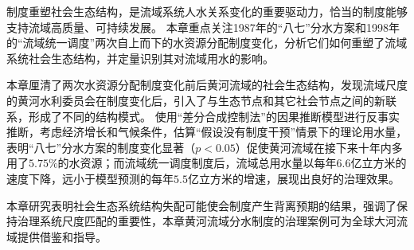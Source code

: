 制度重塑社会\textendash{}生态结构，是流域系统人\textendash{}水关系变化的重要驱动力，恰当的制度能够支持流域高质量、可持续发展。
本章重点关注1987年的``八七''分水方案和1998年的“流域统一调度”两次自上而下的水资源分配制度变化，分析它们如何重塑了流域系统社会\textendash{}生态结构，并定量识别其对流域用水的影响。

本章厘清了两次水资源分配制度变化前后黄河流域的社会\textendash{}生态结构，发现流域尺度的黄河水利委员会在制度变化后，引入了与生态节点和其它社会节点之间的新联系，形成了不同的结构模式。
使用“差分合成控制法”的因果推断模型进行反事实推断，考虑经济增长和气候条件，估算“假设没有制度干预”情景下的理论用水量，表明``八七''分水方案的制度变化显著（$p<0.05$）促使黄河流域在接下来十年内多用了$5.75\%$的水资源；而流域统一调度制度后，流域总用水量以每年$6.6$亿立方米的速度下降，远小于模型预测的每年$5.5$亿立方米的增速，展现出良好的治理效果。

本章研究表明社会\textendash{}生态系统结构失配可能使会制度产生背离预期的结果，强调了保持治理系统尺度匹配的重要性，本章黄河流域分水制度的治理案例可为全球大河流域提供借鉴和指导。
